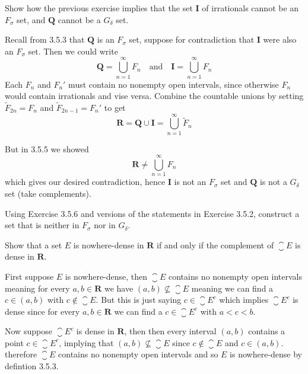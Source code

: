\begin{exercise}
  Show how the previous exercise implies that the set $\mathbf I$ of irrationals cannot be an $F_{\sigma}$ set, and $\mathbf{Q}$ cannot be a $G_{\delta}$ set.
\end{exercise}

\begin{solution}
  Recall from 3.5.3 that $\mathbf Q$ is an $F_\sigma$ set,
  suppose for contradiction that $\mathbf I$ were also an $F_\sigma$ set. Then we could write
  $$
  \mathbf{Q} = \bigcup_{n=1}^\infty F_n \quad\text{and}\quad \mathbf{I} = \bigcup_{n=1}^\infty F_n
  $$
  Each $F_n$ and $F_n'$ must contain no nonempty open intervals, since otherwise $F_n$ would contain irrationals and vise versa.
  Combine the countable unions by setting $\tilde F_{2n} = F_n$ and $\tilde F_{2n-1} = F_n'$ to get
  $$
  \mathbf{R} = \mathbf{Q} \cup \mathbf{I} = \bigcup_{n=1}^\infty \tilde F_n
  $$


  But in 3.5.5 we showed
  $$\mathbf{R} \ne \bigcup_{n=1}^\infty F_n$$
  which gives our desired contradiction, hence $\mathbf{I}$ is not an $F_\sigma$ set and $\mathbf{Q}$ is not a $G_{\delta}$ set (take complements).
\end{solution}

\begin{exercise}
  Using Exercise 3.5.6 and versions of the statements in Exercise 3.5.2, construct a set that is neither in $F_{\sigma}$ nor in $G_{\delta}$.
\end{exercise}

\begin{solution}
  \TODO
\end{solution}

\begin{exercise}
  Show that a set $E$ is nowhere-dense in $\mathbf{R}$ if and only if the complement of $\closure{E}$ is dense in $\mathbf{R}$.
\end{exercise}

\begin{solution}
  First suppose $E$ is nowhere-dense, then $\closure{E}$ contains no nonempty open intervals meaning for every $a,b \in \mathbf R$ we have $(a,b) \not \subseteq \closure{E}$ meaning we can find a $c \in (a,b)$ with $c \notin \closure{E}$. But this is just saying $c \in \closure{E}^c$ which implies $\closure{E}^c$ is dense since for every $a,b \in \mathbf R$ we can find a $c \in \closure{E}^c$ with $a < c < b$.

  Now suppose $\closure{E}^c$ is dense in $\mathbf R$, then then every interval $(a,b)$ contains a point $c \in \closure{E}^c$, implying that $(a,b) \not \subseteq \closure{E}$ since $c \notin \closure{E}$ and $c \in (a,b)$. therefore $\closure{E}$ contains no nonempty open intervals and so $E$ is nowhere-dense by defintion 3.5.3.
\end{solution}

